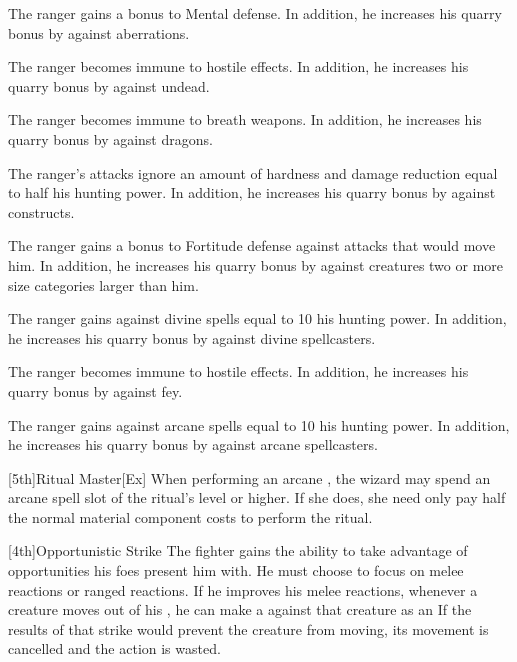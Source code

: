         The ranger gains a  bonus to Mental defense.
        In addition, he increases his quarry bonus by  against aberrations.

        The ranger becomes immune to hostile  effects.
        In addition, he increases his quarry bonus by  against undead.

        The ranger becomes immune to breath weapons.
        In addition, he increases his quarry bonus by  against dragons.

        The ranger's attacks ignore an amount of hardness and damage reduction equal to half his hunting power.
        In addition, he increases his quarry bonus by  against constructs.

        The ranger gains a  bonus to Fortitude defense against attacks that would move him.  %
        In addition, he increases his quarry bonus by  against creatures two or more size categories larger than him.

        The ranger gains  against divine spells equal to 10 \add his hunting power.
        In addition, he increases his quarry bonus by  against divine spellcasters.

        The ranger becomes immune to hostile  effects.
        In addition, he increases his quarry bonus by  against fey.

        The ranger gains  against arcane spells equal to 10 \add his hunting power.
        In addition, he increases his quarry bonus by  against arcane spellcasters.

        [5th]{Ritual Master}[Ex]
        When performing an arcane , the wizard may spend an arcane spell slot of the ritual's level or higher.
        If she does, she need only pay half the normal material component costs to perform the ritual.

        [4th]{Opportunistic Strike} The fighter gains the ability to take advantage of opportunities his foes present him with.
        He must choose to focus on melee reactions or ranged reactions.
        If he improves his melee reactions, whenever a creature moves out of his , he can make a  against that creature as an 
        If the results of that strike would prevent the creature from moving, its movement is cancelled and the action is wasted.

